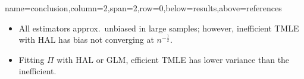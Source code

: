 \documentclass[landscape,a0paper,fontscale=0.285]{baposter} %
\begin{document}
\begin{poster}


{name=conclusion,column=2,span=2,row=0,below=results,above=references}{

\vspace{0.25em}

\begin{multicols}{2}




\begin{itemize}
  \itemsep0pt
  \item All estimators approx.~unbiased in large samples; however, inefficient
    TMLE with HAL has bias not converging at $n^{-\frac{1}{2}}$.
  \item Fitting $\Pi$ with HAL or GLM, efficient TMLE has lower variance than
    the inefficient.\\
\end{itemize}

\end{multicols}
}


\end{poster}
\end{document}
